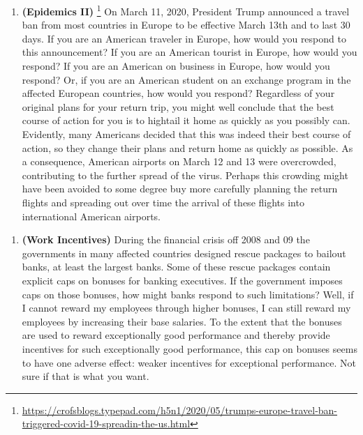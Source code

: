 \documentclass[
]{book}
\providecommand{\tightlist}{%
  \setlength{\itemsep}{0pt}\setlength{\parskip}{0pt}}
\begin{document}
\begin{enumerate}
\def\labelenumi{\arabic{enumi}.}
\setcounter{enumi}{1}
\tightlist
\item
  \textbf{(Epidemics II)} \footnote{\url{https://crofsblogs.typepad.com/h5n1/2020/05/trumps-europe-travel-ban-triggered-covid-19-spreadin-the-us.html}} On March 11, 2020, President Trump announced a travel ban from most countries in Europe to be effective March 13th and to last 30 days. If you are an American traveler in Europe, how would you respond to this announcement? If you are an American tourist in Europe, how would you respond? If you are an American on business in Europe, how would you respond? Or, if you are an American student on an exchange program in the affected European countries, how would you respond? Regardless of your original plans for your return trip, you might well conclude that the best course of action for you is to hightail it home as quickly as you possibly can. Evidently, many Americans decided that this was indeed their best course of action, so they change their plans and return home as quickly as possible. As a consequence, American airports on March 12 and 13 were overcrowded, contributing to the further spread of the virus. Perhaps this crowding might have been avoided to some degree buy more carefully planning the return flights and spreading out over time the arrival of these flights into international American airports.
\end{enumerate}

\begin{enumerate}
\def\labelenumi{\arabic{enumi}.}
\setcounter{enumi}{2}
\tightlist
\item
  \textbf{(Work Incentives)} During the financial crisis off 2008 and 09 the governments in many affected countries designed rescue packages to bailout banks, at least the largest banks. Some of these rescue packages contain explicit caps on bonuses for banking executives. If the government imposes caps on those bonuses, how might banks respond to such limitations? Well, if I cannot reward my employees through higher bonuses, I can still reward my employees by increasing their base salaries. To the extent that the bonuses are used to reward exceptionally good performance and thereby provide incentives for such exceptionally good performance, this cap on bonuses seems to have one adverse effect: weaker incentives for exceptional performance. Not sure if that is what you want.
\end{enumerate}
\end{document}
